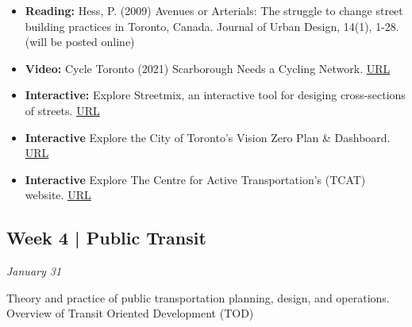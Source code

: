 \documentclass[11pt]{article}
\begin{document}
	\begin{itemize}
		\item \textbf{Reading:} Hess, P. (2009) Avenues or Arterials: The struggle to change street building practices in Toronto, Canada. Journal of Urban Design, 14(1), 1-28. (will be posted online)
		
		\item \textbf{Video:} Cycle Toronto (2021) Scarborough Needs a Cycling Network. \href{https://www.youtube.com/watch?v=gnwhc9fBa5k}{URL}
				
		\item \textbf{Interactive:} Explore Streetmix, an interactive tool for desiging cross-sections of streets. \href{https://streetmix.net}{URL}
		
		\item \textbf{Interactive} Explore the City of Toronto's Vision Zero Plan \& Dashboard. \href{https://www.toronto.ca/services-payments/streets-parking-transportation/road-safety/vision-zero/vision-zero-dashboard/}{URL}
		
		\item \textbf{Interactive} Explore The Centre for Active Transportation's (TCAT) website. \href{https://www.tcat.ca/}{URL}
		
	\end{itemize}
	
	
	

	

		
	\subsection*{Week 4 | Public Transit}
	
	\textit{January 31}
	
	Theory and practice of public transportation planning, design, and operations. Overview of Transit Oriented Development (TOD)
	
\end{document}
